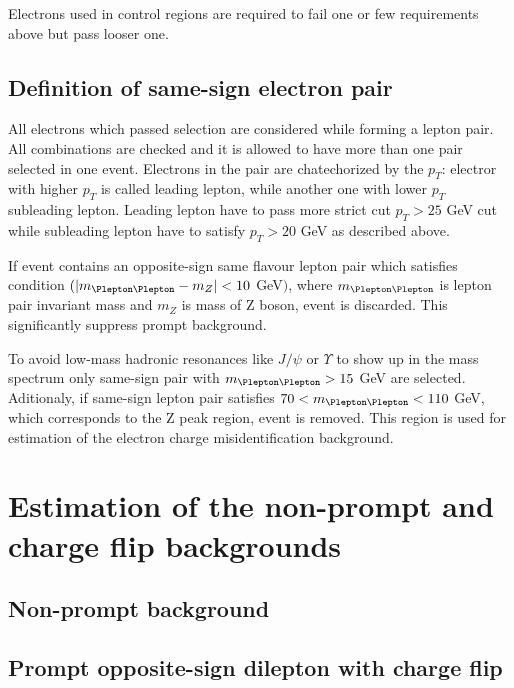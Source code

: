 Electrons used in control regions are required to fail one or few requirements above but pass looser one.

\subsection{Definition of same-sign electron pair}
All electrons which passed selection are considered while forming a lepton pair.
All combinations are checked and it is allowed to have more than one pair selected in one event.
Electrons in the pair are chatechorized by the $p_T$: electror with higher $p_T$ is called leading lepton, while another one with lower $p_T$ subleading lepton.
Leading lepton have to pass more strict cut $p_T>25$ GeV cut while subleading lepton have to satisfy $p_T>20$ GeV as described above.

If event contains an opposite-sign same flavour lepton pair which satisfies condition $( |m_{\Plepton\Plepton} - m_{Z}| < 10$ GeV$)$,
where $m_{\Plepton\Plepton}$ is lepton pair invariant mass and $m_{Z}$ is mass of Z boson, event is discarded.
This significantly suppress prompt background.

To avoid low-mass hadronic resonances like $J/\psi$ or $\varUpsilon$ to show up in the mass spectrum only same-sign pair with $m_{\Plepton\Plepton}>15$ GeV are selected.
Aditionaly, if same-sign lepton pair satisfies $70 < m_{\Plepton\Plepton}< 110$ GeV, which corresponds to the Z peak region, event is removed.
This region is used for estimation of the electron charge misidentification background.

\section{Estimation of the non-prompt and charge flip backgrounds}
\subsection{Non-prompt background}

\subsection{Prompt opposite-sign dilepton with charge flip}

